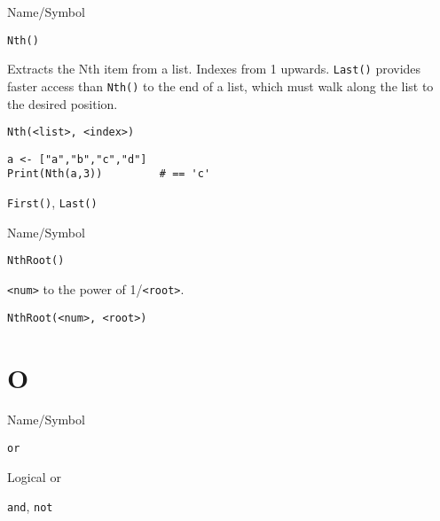 \rl




\begin{desc}{Name/Symbol}
\item[Name/Symbol]	\verb+Nth()+

\item[Description]	Extracts the Nth item from a list.  Indexes from 1 upwards.
		\verb+Last()+ provides faster access than \verb+Nth()+ to the end of a list, 
		which must walk along the list to the desired position.

\item[Usage]
\begin{verbatim}
Nth(<list>, <index>)
\end{verbatim}

\item[Example]	
\begin{verbatim}
a <- ["a","b","c","d"]
Print(Nth(a,3)) 		# == 'c'
\end{verbatim}

\item[See Also]	\verb+First()+, \verb+Last()+ 
\end{desc}

\rl


\begin{desc}{Name/Symbol}
\item[Name/Symbol]	\verb+NthRoot()+

\item[Description]	\verb+<num>+ to the power of  1/\verb+<root>+.

\item[Usage]		
\begin{verbatim}
NthRoot(<num>, <root>)
\end{verbatim}

\item[Example]	

\item[See Also]	
\end{desc}

\rl
\section{O}
\rl


\begin{desc}{Name/Symbol}
\item[Name/Symbol]	\verb+or+                   

\item[Description]	Logical or

\item[Usage]		

\item[Example]	

\item[See Also]	\verb+and+, \verb+not+
\end{desc}

